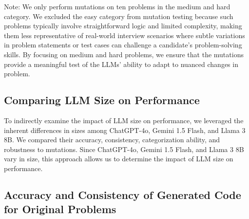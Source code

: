 \documentclass[times, 10pt,twocolumn]{article}
\begin{document}
Note: We only perform mutations on ten problems in the medium and hard category. We excluded the easy category from mutation testing because such problems typically involve straightforward logic and limited complexity, making them less representative of real-world interview scenarios where subtle variations in problem statements or test cases can challenge a candidate's problem-solving skills. By focusing on medium and hard problems, we ensure that the mutations provide a meaningful test of the LLMs’ ability to adapt to nuanced changes in problem.

\subsection{Comparing LLM Size on Performance}
To indirectly examine the impact of LLM size on performance, we leveraged the inherent differences in sizes among ChatGPT-4o, Gemini 1.5 Flash, and Llama 3 8B. We compared their accuracy, consistency, categorization ability, and robustness to mutations. Since ChatGPT-4o, Gemini 1.5 Flash, and Llama 3 8B vary in size, this approach allows us to determine the impact of LLM size on performance.


\subsection{Accuracy and Consistency of Generated Code for Original Problems}
\end{document}
